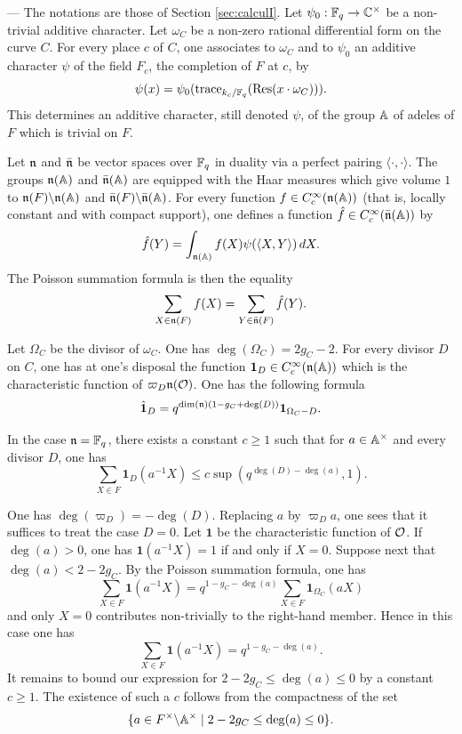 \begin{paragr} ---\label{S:fourier}
The notations are those of Section \ref{sec:calculI}. Let $\psi_0 : \mathbb{F}_q \to \mathbb{C}^\times$ be a non-trivial additive character. Let $\omega_C$ be a non-zero rational differential form on the curve $C$. For every place $c$ of $C$, one associates to $\omega_C$ and to $\psi_0$ an additive character $\psi$ of the field $F_c$, the completion of $F$ at $c$, by
$$\psi(x)=\psi_0(\mathrm{trace}_{k_c/\mathbb{F}_q}(\operatorname{Res}(x\cdot \omega_C))).$$
This determines an additive character, still denoted $\psi$, of the group $\mathbb{A}$ of adeles of $F$ which is trivial on $F$.

Let $\mathfrak{n}$ and $\bar{\mathfrak{n}}$ be vector spaces over $\mathbb{F}_q$ in duality via a perfect pairing $\langle \cdot,\cdot\rangle$. The groups $\mathfrak{n}(\mathbb{A})$ and $\bar{\mathfrak{n}}(\mathbb{A})$ are equipped with the Haar measures which give volume $1$ to $\mathfrak{n}(F)\backslash \mathfrak{n}(\mathbb{A})$ and $\bar{\mathfrak{n}}(F)\backslash \bar{\mathfrak{n}}(\mathbb{A})$. For every function $f\in C_c^\infty(\mathfrak{n}(\mathbb{A}))$ (that is, locally constant and with compact support), one defines a function $\hat{f}\in C_c^\infty(\bar{\mathfrak{n}}(\mathbb{A}))$ by
$$\hat{f}(Y)=\int_{\mathfrak{n}(\mathbb{A})} f(X)\psi(\langle X,Y\rangle)\, dX.$$
The Poisson summation formula is then the equality
$$\sum_{X\in \mathfrak{n}(F)} f(X)=\sum_{Y\in \bar{\mathfrak{n}}(F)} \hat{f}(Y).$$

Let $\Omega_C$ be the divisor of $\omega_C$. One has $\deg(\Omega_C)=2g_C-2$. For every divisor $D$ on $C$, one has at one's disposal the function $\mathbf{1}_D\in C_c^\infty(\mathfrak{n}(\mathbb{A}))$ which is the characteristic function of $\varpi_D\mathfrak{n}(\mathcal{O})$. One has the following formula
\begin{equation}
  \label{eq:Fourier1D}
  \hat{\mathbf{1}}_D=q^{\dim(\mathfrak{n})(1-g_C+\deg(D))}\mathbf{1}_{\Omega_C-D}.
\end{equation}

\begin{lemme}\label{lem:maj1D}
In the case $\mathfrak{n}=\mathbb{F}_q$, there exists a constant $c\geq 1$ such that for $a\in \mathbb{A}^\times$ and every divisor $D$, one has
$$\sum_{X\in F} \mathbf{1}_D(a^{-1}X)\leq c\sup(q^{\deg(D)-\deg(a)},1).$$
\end{lemme}

\begin{preuve}
One has $\deg(\varpi_D)=-\deg(D)$. Replacing $a$ by $\varpi_D a$, one sees that it suffices to treat the case $D=0$. Let $\mathbf{1}$ be the characteristic function of $\mathcal{O}$. If $\deg(a)>0$, one has $\mathbf{1}(a^{-1}X)=1$ if and only if $X=0$. Suppose next that $\deg(a)<2-2g_C$. By the Poisson summation formula, one has
$$\sum_{X\in F}\mathbf{1}(a^{-1}X)=q^{1-g_C-\deg(a)}\sum_{X\in F}\mathbf{1}_{\Omega_C}(aX)$$
and only $X=0$ contributes non-trivially to the right-hand member. Hence in this case one has
$$\sum_{X\in F}\mathbf{1}(a^{-1}X)=q^{1-g_C-\deg(a)}.$$
It remains to bound our expression for $2-2g_C\leq \deg(a)\leq 0$ by a constant $c\geq 1$. The existence of such a $c$ follows from the compactness of the set
$$\{a\in F^\times\backslash \mathbb{A}^\times \mid 2-2g_C\leq \deg(a)\leq 0\}.$$
\end{preuve}
\end{paragr}

